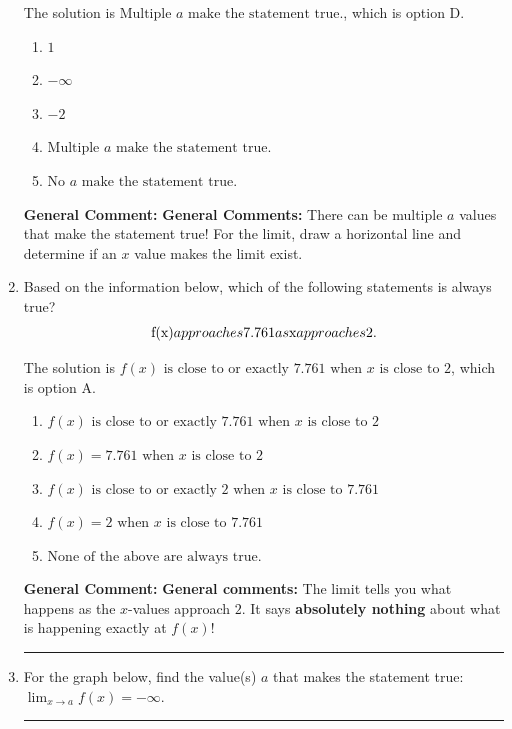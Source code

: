 \documentclass{extbook}[14pt]
\newcommand{\litem}[1]{\item #1

\rule{\textwidth}{0.4pt}}
\begin{document}
\begin{enumerate}
{The solution is \( \text{Multiple } a \text{ make the statement true}. \), which is option D.\begin{enumerate}[label=\Alph*.]
\item \( 1 \)


\item \( -\infty \)


\item \( -2 \)


\item \( \text{Multiple } a \text{ make the statement true}. \)


\item \( \text{No } a \text{ make the statement true}. \)


\end{enumerate}

\textbf{General Comment:} \textbf{General Comments:} There can be multiple $a$ values that make the statement true! For the limit, draw a horizontal line and determine if an $x$ value makes the limit exist.
}
\litem{
Based on the information below, which of the following statements is always true?
\[ $f(x)$ approaches $7.761$ as $x$ approaches $2$. \]

The solution is \( f(x) \text{ is close to or exactly } 7.761 \text{ when } x \text{ is close to } 2 \), which is option A.\begin{enumerate}[label=\Alph*.]
\item \( f(x) \text{ is close to or exactly } 7.761 \text{ when } x \text{ is close to } 2 \)


\item \( f(x) = 7.761 \text{ when } x \text{ is close to } 2 \)


\item \( f(x) \text{ is close to or exactly } 2 \text{ when } x \text{ is close to } 7.761 \)


\item \( f(x) = 2 \text{ when } x \text{ is close to } 7.761 \)


\item \( \text{None of the above are always true.} \)


\end{enumerate}

\textbf{General Comment:} \textbf{General comments:} The limit tells you what happens as the $x$-values approach $2$. It says \textbf{absolutely nothing} about what is happening exactly at $f(x)$!
}
\litem{
For the graph below, find the value(s) $a$ that makes the statement true: $ \displaystyle \lim_{x \rightarrow a} f(x) = -\infty$.

}
\end{enumerate}
\end{document}
